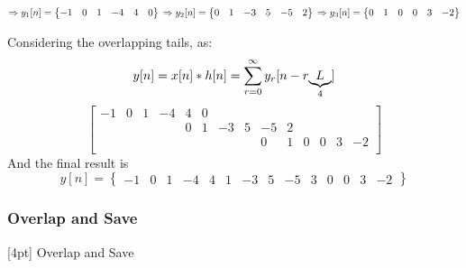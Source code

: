 {        $
        \Rightarrow y_1[n]=\begin{Bmatrix}
            -1 & 0 & 1 & -4 & 4 & 0
        \end{Bmatrix}\\
        \Rightarrow y_2[n]=\begin{Bmatrix}
            0 & 1 & -3 & 5 & -5 & 2
        \end{Bmatrix}\\
        \Rightarrow y_3[n]=\begin{Bmatrix}
            0 & 1 & 0 & 0 & 3 & -2
        \end{Bmatrix}
        $

        \vspace{1em}
        Considering the overlapping tails, as:
        $$
        y[n]=x[n]*h[n]=\sum_{r=0}^\infty y_r[n-r\underlabel{L}{4}]
        $$
        $$
        \begin{bmatrix}
            -1 & 0 & 1 &-4 & 4 & 0\\
            &   &   &   & 0 & 1 &-3 & 5 &-5 & 2\\    
            &   &   &   &   &   &   &   & 0 & 1 & 0 & 0 & 3 & -2\\    
        \end{bmatrix}
        $$
        And the final result is
        $$
        y[n]=\begin{Bmatrix}
            -1 & 0 & 1 & -4 & 4 & 1 & -3 & 5 & -5 & 3 & 0 & 0 & 3 & -2
        \end{Bmatrix}
        $$
    }
    
    \subsubsection{Overlap and Save}
    [4pt] Overlap and Save

